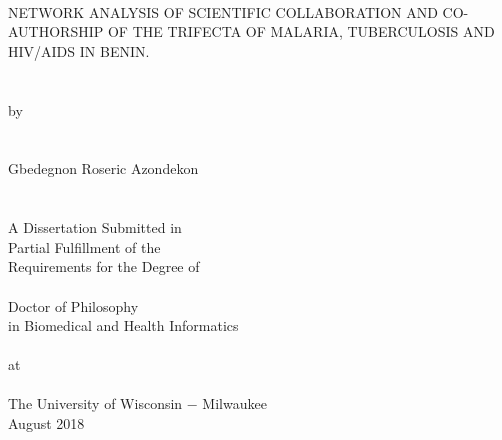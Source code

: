 \clearpage
\thispagestyle{empty}
\hbox{\ }
\renewcommand{\baselinestretch}{1}
\small\normalsize

\vspace{-.65in}

\begin{center}
\LARGE \MakeUppercase{Network Analysis of Scientific Collaboration and Co-authorship of the Trifecta of Malaria, Tuberculosis and HIV/AIDS in Benin.}\\~\\~\\
\large by\\~\\~\\
\LARGE Gbedegnon Roseric Azondekon\\~\\~\\ \large
A Dissertation Submitted in\\
Partial Fulfillment of the\\
Requirements for the Degree of\\~\\
Doctor of Philosophy\\
in Biomedical and Health Informatics\\~\\
at\\~\\
The University of Wisconsin $-$ Milwaukee\\
August 2018
\end{center}

\vfill
